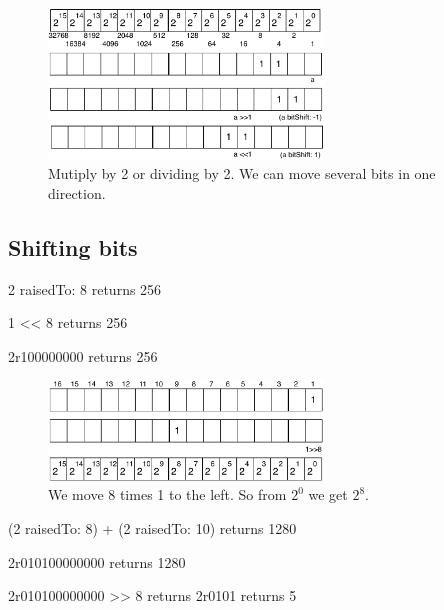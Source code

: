 \documentclass[a4paper,10pt,twoside]{book}
\begin{document}
\begin{figure}[h]
\begin{center}
\includegraphics[width=0.65\textwidth]{16bits-numberMultiplication2}
\caption{Mutiply by 2 or dividing by 2. We can move several bits in one direction.}
\end{center}
\end{figure}

\subsection*{Shifting bits}


\begin{code}{}
2 raisedTo: 8
	returns 256
	
1 << 8
	returns 256
	
2r100000000
	returns 256
		
\end{code}

\begin{figure}[h]
\begin{center}
\includegraphics[width=0.65\textwidth]{16bits-1shifted8}
\caption{We move 8 times 1 to the left. So from $2^{0}$ we get $2^{8}$.}
\end{center}
\end{figure}

\begin{code}{}
(2 raisedTo: 8) + (2 raisedTo: 10) 
	returns 1280
	
2r010100000000
	returns 1280
	
2r010100000000 >> 8
	returns	2r0101
	returns 5
\end{code}
\end{document}
